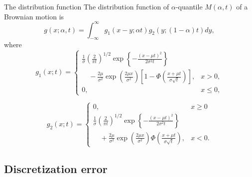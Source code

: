 \documentclass[cjk,10pt]{beamer}
\begin{document}
\begin{frame}{The distribution function}
The distribution function of $\alpha$-quantile $M(\alpha,t)$ of a Brownian motion is 
\begin{equation}\label{eq:fulldensity}
g(x; \alpha , t) = \int^{\infty}_{-\infty} g_1 (x-y; \alpha t) g_2 (y; (1-\alpha) t)dy ,
\end{equation}
where
\begin{equation}
g_1 (x;t) = \begin{cases}
\displaystyle\frac{1}{\sigma}\left({\frac{2}{\pi t}}\right)^{1/2}\exp\left\{-\frac{(x-\mu t)^2}{2\sigma ^2 t}\right\} \\
\displaystyle\quad - \frac{2\mu}{\sigma ^2} \exp\left(\frac{2\mu x}{\sigma ^2}\right)\left[1- \Phi \left(\frac{x+\mu t}{\sigma \sqrt{t}}\right)\right], & x > 0 ,\\
0 , & x  \leq 0 ,
\end{cases}
\end{equation}

\begin{equation}
g_2 (x;t) = \begin{cases}
0, & x \geq 0 \\
\displaystyle\frac{1}{\sigma}\left({\frac{2}{\pi t}}\right)^{1/2}\exp\left\{-\frac{(x-\mu t)^2}{2\sigma ^2 t}\right\} \\
\displaystyle\quad + \frac{2\mu}{\sigma ^2} \exp\left(\frac{2\mu x}{\sigma ^2}\right) \Phi \left(\frac{x+\mu t}{\sigma \sqrt{t}}\right) , & x < 0.
\end{cases}
\end{equation}
\end{frame}

%
%
%
%


\subsection{Discretization error}
\end{document}
